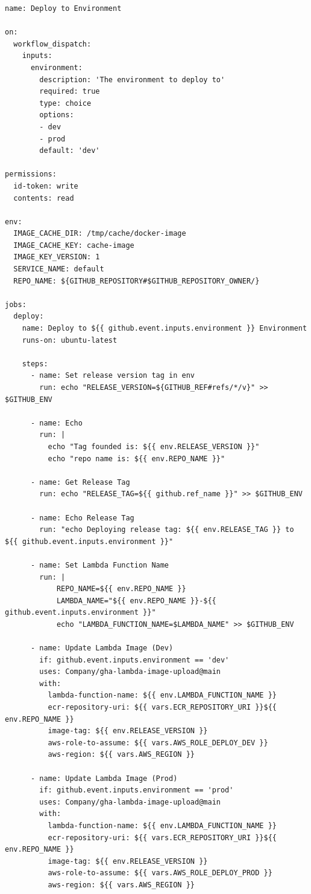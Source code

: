 \begin{lstlisting}[label={lst:cd-workflow}]
name: Deploy to Environment

on:
  workflow_dispatch:
    inputs:
      environment:
        description: 'The environment to deploy to'
        required: true
        type: choice
        options:
        - dev
        - prod
        default: 'dev'

permissions:
  id-token: write
  contents: read

env:
  IMAGE_CACHE_DIR: /tmp/cache/docker-image
  IMAGE_CACHE_KEY: cache-image
  IMAGE_KEY_VERSION: 1
  SERVICE_NAME: default
  REPO_NAME: ${GITHUB_REPOSITORY#$GITHUB_REPOSITORY_OWNER/}

jobs:
  deploy:
    name: Deploy to ${{ github.event.inputs.environment }} Environment
    runs-on: ubuntu-latest

    steps:
      - name: Set release version tag in env
        run: echo "RELEASE_VERSION=${GITHUB_REF#refs/*/v}" >> $GITHUB_ENV

      - name: Echo
        run: |
          echo "Tag founded is: ${{ env.RELEASE_VERSION }}"
          echo "repo name is: ${{ env.REPO_NAME }}"

      - name: Get Release Tag
        run: echo "RELEASE_TAG=${{ github.ref_name }}" >> $GITHUB_ENV

      - name: Echo Release Tag
        run: "echo Deploying release tag: ${{ env.RELEASE_TAG }} to ${{ github.event.inputs.environment }}"

      - name: Set Lambda Function Name
        run: |
            REPO_NAME=${{ env.REPO_NAME }}
            LAMBDA_NAME="${{ env.REPO_NAME }}-${{ github.event.inputs.environment }}"
            echo "LAMBDA_FUNCTION_NAME=$LAMBDA_NAME" >> $GITHUB_ENV

      - name: Update Lambda Image (Dev)
        if: github.event.inputs.environment == 'dev'
        uses: Company/gha-lambda-image-upload@main
        with:
          lambda-function-name: ${{ env.LAMBDA_FUNCTION_NAME }}
          ecr-repository-uri: ${{ vars.ECR_REPOSITORY_URI }}${{ env.REPO_NAME }}
          image-tag: ${{ env.RELEASE_VERSION }}
          aws-role-to-assume: ${{ vars.AWS_ROLE_DEPLOY_DEV }}
          aws-region: ${{ vars.AWS_REGION }}

      - name: Update Lambda Image (Prod)
        if: github.event.inputs.environment == 'prod'
        uses: Company/gha-lambda-image-upload@main
        with:
          lambda-function-name: ${{ env.LAMBDA_FUNCTION_NAME }}
          ecr-repository-uri: ${{ vars.ECR_REPOSITORY_URI }}${{ env.REPO_NAME }}
          image-tag: ${{ env.RELEASE_VERSION }}
          aws-role-to-assume: ${{ vars.AWS_ROLE_DEPLOY_PROD }}
          aws-region: ${{ vars.AWS_REGION }}
\end{lstlisting}

